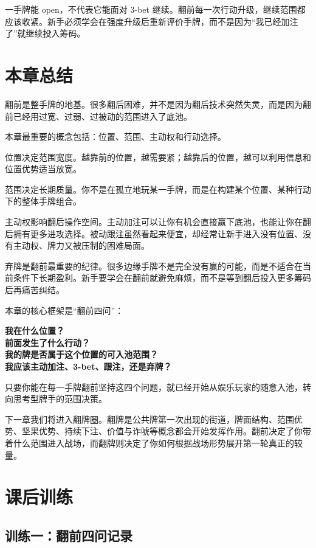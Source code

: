 一手牌能 open，不代表它能面对 3-bet 继续。翻前每一次行动升级，继续范围都应该收紧。新手必须学会在强度升级后重新评价手牌，而不是因为“我已经加注了”就继续投入筹码。

\section{本章总结}

翻前是整手牌的地基。很多翻后困难，并不是因为翻后技术突然失灵，而是因为翻前已经用过宽、过弱、过被动的范围进入了底池。

本章最重要的概念包括：位置、范围、主动权和行动选择。

位置决定范围宽度。越靠前的位置，越需要紧；越靠后的位置，越可以利用信息和位置优势适当放宽。

范围决定长期质量。你不是在孤立地玩某一手牌，而是在构建某个位置、某种行动下的整体手牌组合。

主动权影响翻后操作空间。主动加注可以让你有机会直接赢下底池，也能让你在翻后拥有更多进攻选择。被动跟注虽然看起来便宜，却经常让新手进入没有位置、没有主动权、牌力又被压制的困难局面。

弃牌是翻前最重要的纪律。很多边缘手牌不是完全没有赢的可能，而是不适合在当前条件下长期盈利。新手要学会在翻前就避免麻烦，而不是等到翻后投入更多筹码后再痛苦纠结。

本章的核心框架是“翻前四问”：

\begin{center}
\textbf{我在什么位置？\\
前面发生了什么行动？\\
我的牌是否属于这个位置的可入池范围？\\
我应该主动加注、3-bet、跟注，还是弃牌？}
\end{center}

只要你能在每一手牌翻前坚持这四个问题，就已经开始从娱乐玩家的随意入池，转向思考型牌手的范围决策。

下一章我们将进入翻牌圈。翻牌是公共牌第一次出现的街道，牌面结构、范围优势、坚果优势、持续下注、价值与诈唬等概念都会开始发挥作用。翻前决定了你带着什么范围进入战场，而翻牌则决定了你如何根据战场形势展开第一轮真正的较量。

\section{课后训练}

\subsection*{训练一：翻前四问记录}

